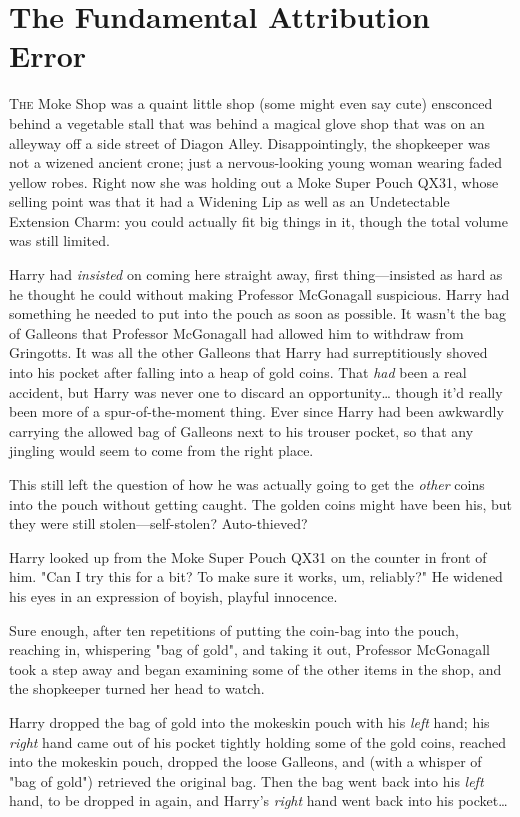 \chapter{The Fundamental Attribution Error}

\lettrine{T}{he} Moke Shop was a quaint little shop (some might even say cute) ensconced 
behind a vegetable stall that was behind a magical glove shop that was on an 
alleyway off a side street of Diagon Alley. Disappointingly, the shopkeeper was 
not a wizened ancient crone; just a nervous-looking young woman wearing faded 
yellow robes. Right now she was holding out a Moke Super Pouch QX31, whose 
selling point was that it had a Widening Lip as well as an Undetectable 
Extension Charm: you could actually fit big things in it, though the total 
volume was still limited.

Harry had \emph{insisted} on coming here straight away, first thing---insisted 
as hard as he thought he could without making Professor McGonagall suspicious. 
Harry had something he needed to put into the pouch as soon as possible. It 
wasn't the bag of Galleons that Professor McGonagall had allowed him to 
withdraw from Gringotts. It was all the other Galleons that Harry had 
surreptitiously shoved into his pocket after falling into a heap of gold coins. 
That \emph{had} been a real accident, but Harry was never one to discard an 
opportunity{\ldots} though it'd really been more of a spur-of-the-moment thing. 
Ever since Harry had been awkwardly carrying the allowed bag of Galleons next 
to his trouser pocket, so that any jingling would seem to come from the right 
place.

This still left the question of how he was actually going to get the 
\emph{other} coins into the pouch without getting caught. The golden coins 
might have been his, but they were still stolen---self-stolen? Auto-thieved?

Harry looked up from the Moke Super Pouch QX31 on the counter in front of him. 
"Can I try this for a bit? To make sure it works, um, reliably?" He widened his 
eyes in an expression of boyish, playful innocence.

Sure enough, after ten repetitions of putting the coin-bag into the pouch, 
reaching in, whispering "bag of gold", and taking it out, Professor McGonagall 
took a step away and began examining some of the other items in the shop, and 
the shopkeeper turned her head to watch.

Harry dropped the bag of gold into the mokeskin pouch with his \emph{left} 
hand; his \emph{right} hand came out of his pocket tightly holding some of the 
gold coins, reached into the mokeskin pouch, dropped the loose Galleons, and 
(with a whisper of "bag of gold") retrieved the original bag. Then the bag went 
back into his \emph{left} hand, to be dropped in again, and Harry's 
\emph{right} hand went back into his pocket{\ldots}

